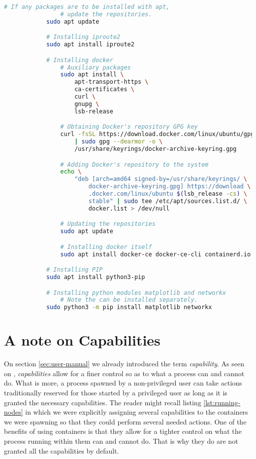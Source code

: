        \begin{lstlisting}[language = bash, caption = Commands for Installing Needed Dependencies., label = lst:dependency-installation]
            # If any packages are to be installed with apt,
                # update the repositories.
            sudo apt update

            # Installing iproute2
            sudo apt install iproute2

            # Installing docker
                # Auxiliary packages
                sudo apt install \
                    apt-transport-https \
                    ca-certificates \
                    curl \
                    gnupg \
                    lsb-release

                # Obtaining Docker's repository GPG key
                curl -fsSL https://download.docker.com/linux/ubuntu/gpg \
                    | sudo gpg --dearmor -o \
                    /usr/share/keyrings/docker-archive-keyring.gpg

                # Adding Docker's repository to the system
                echo \
                    "deb [arch=amd64 signed-by=/usr/share/keyrings/ \
                        docker-archive-keyring.gpg] https://download \
                        .docker.com/linux/ubuntu $(lsb_release -cs) \
                        stable" | sudo tee /etc/apt/sources.list.d/ \
                        docker.list > /dev/null

                # Updating the repositories
                sudo apt update

                # Installing docker itself
                sudo apt install docker-ce docker-ce-cli containerd.io

            # Installing PIP
            sudo apt install python3-pip

            # Installing python modules matplotlib and networkx
                # Note the can be installed separately.
            sudo python3 -m pip install matplotlib networkx
        \end{lstlisting}

    \section{A note on Capabilities}
        On section \ref{sec:user-manual} we already introduced the term \textit{capability}. As seen on \cite{bib:man-capabilities}, \textit{capabilities} allow for a finer control so as to what a process can and cannot do. What is more, a process spawned by a non-privileged user can take actions traditionally reserved for those started by a privileged user as long as it is granted the necessary capabilities. The reader might recall listing \ref{lst:running-nodes} in which we were explicitly assigning several capabilities to the containers we were spawning so that they could perform several needed actions. One of the benefits of using containers is that they allow for a tighter control on what the process running within them can and cannot do. That is why they do are not granted all the capabilities by default.\\

